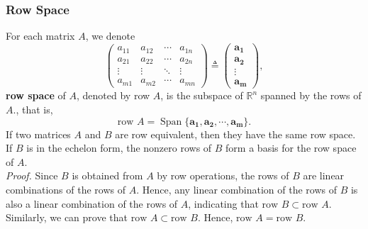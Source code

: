\documentclass[10pt, a4paper]{article}
\newcommand{\R}{\mathbb{R}}
\newcommand{\vt}[1]{\mathbf{#1}}
\begin{document}
\subsubsection*{Row Space}
\indent For each matrix $A$, we denote\[
\begin{pmatrix}
    a_{11} & a_{12} & \cdots & a_{1n}\\
    a_{21} & a_{22} & \cdots & a_{2n}\\
    \vdots & \vdots & \ddots & \vdots\\
    a_{m1} & a_{m2} & \cdots & a_{mn}
\end{pmatrix}
\triangleq \begin{pmatrix}
    \vt{a_1}\\\vt{a_2}\\\vdots\\\vt{a_m}
\end{pmatrix},
\]
\textbf{row space} of $A$, denoted by row $A$, is the subspace of $\R^n$ spanned by the rows of $A$., that is, \[
\text{row }A = \operatorname*{Span}\{\vt{a_1}, \vt{a_2}, \cdots, \vt{a_m}\}.
\]
If two matrices $A$ and $B$ are row equivalent, then they have the same row space. If $B$ is in the echelon form, the nonzero rows of $B$ form a basis for the row space of $A$.\\\subset \subseteq 
\indent \textit{Proof.} Since $B$ is obtained from $A$ by row operations, the rows of $B$ are linear combinations of the rows of $A$. Hence, any linear combination of the rows of $B$ is also a linear combination of the rows of $A$, indicating that $\text{row }B\subset \text{row }A$. Similarly, we can prove that $\text{row }A\subset \text{row }B$. Hence, $\text{row }A = \text{row }B$.\\
\end{document}
